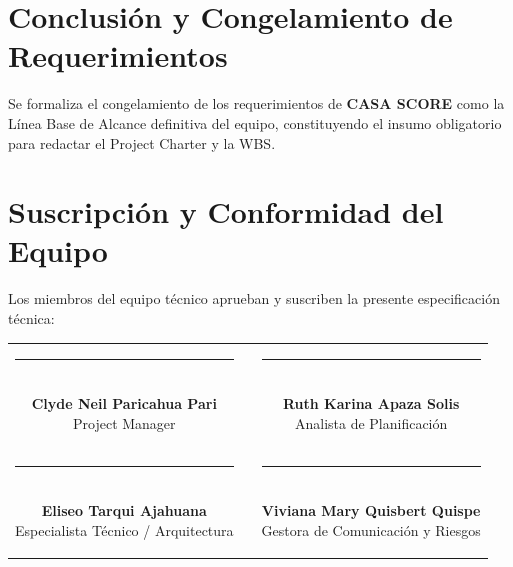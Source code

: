 \documentclass[11pt,a4paper]{article}
\begin{document}
\section{Conclusión y Congelamiento de Requerimientos}
Se formaliza el congelamiento de los requerimientos de \textbf{CASA SCORE} como la Línea Base de Alcance definitiva del equipo, constituyendo el insumo obligatorio para redactar el Project Charter y la WBS.

\vspace{0.4cm}

\section{Suscripción y Conformidad del Equipo}
\noindent Los miembros del equipo técnico aprueban y suscriben la presente especificación técnica:

\vspace{1.8cm}

\begin{center}
\begin{tabular}{c c c}
    \parbox{6.5cm}{\centering \rule{6.0cm}{0.6pt}\\[5pt] \textbf{Clyde Neil Paricahua Pari}\\[2pt] {\footnotesize Project Manager}} 
    & \hspace{0.8cm} &
    \parbox{6.5cm}{\centering \rule{6.0cm}{0.6pt}\\[5pt] \textbf{Ruth Karina Apaza Solis}\\[2pt] {\footnotesize Analista de Planificación}} 
    \\[2.2cm]
    \parbox{6.5cm}{\centering \rule{6.0cm}{0.6pt}\\[5pt] \textbf{Eliseo Tarqui Ajahuana}\\[2pt] {\footnotesize Especialista Técnico / Arquitectura}} 
    & \hspace{0.8cm} &
    \parbox{6.5cm}{\centering \rule{6.0cm}{0.6pt}\\[5pt] \textbf{Viviana Mary Quisbert Quispe}\\[2pt] {\footnotesize Gestora de Comunicación y Riesgos}}
\end{tabular}
\end{center}
\end{document}
